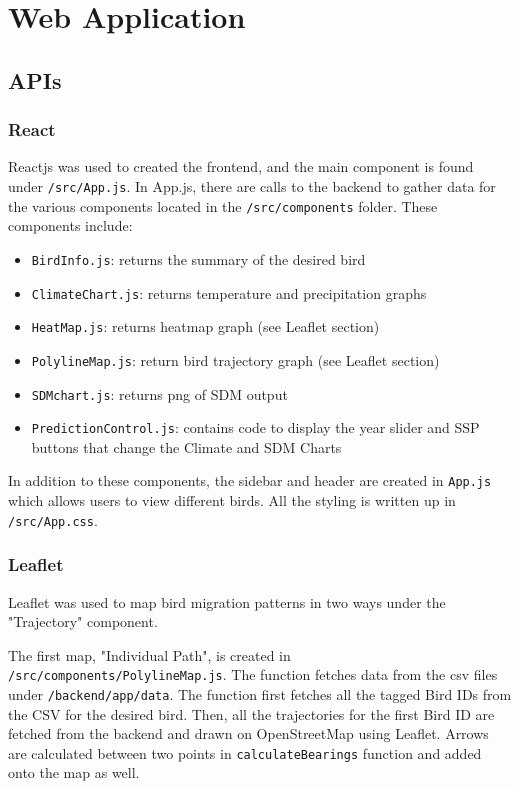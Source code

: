 \documentclass{article}
\begin{document}
\section{Web Application}

\subsection{APIs}

\subsubsection{React}
Reactjs was used to created the frontend, and the main component is found under \texttt{/src/App.js}. In App.js, there are calls to the backend to gather data for the various components
located in the \texttt{/src/components} folder. These components include:
\begin{itemize}
	\item \texttt{BirdInfo.js}: returns the summary of the desired bird
	\item \texttt{ClimateChart.js}: returns temperature and precipitation graphs
	\item \texttt{HeatMap.js}: returns heatmap graph (see Leaflet section)
	\item \texttt{PolylineMap.js}: return bird trajectory graph (see Leaflet section)
	\item \texttt{SDMchart.js}: returns png of SDM output
	\item \texttt{PredictionControl.js}: contains code to display the year slider and SSP buttons that change the Climate and SDM Charts
\end{itemize}

\noindent In addition to these components, the sidebar and header are created in \texttt{App.js} which allows users to view different birds. All the styling is written up in \texttt{/src/App.css}. 


\subsubsection{Leaflet}
Leaflet was used to map bird migration patterns in two ways under the "Trajectory" component. 

The first map, "Individual Path", is created in \texttt{/src/components/PolylineMap.js}.
The function fetches data from the csv files under  \texttt{/backend/app/data}. The function first fetches all the tagged Bird IDs from the CSV for the desired bird. Then,
all the trajectories for the first Bird ID are fetched from the backend and drawn on OpenStreetMap using Leaflet.  Arrows are calculated between two points in \texttt{calculateBearings} 
function and added onto the map as well. 
\end{document}
